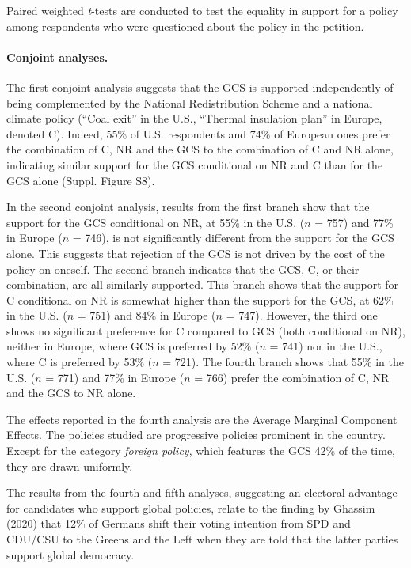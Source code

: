 \documentclass[12pt,english]{article}
\begin{document}
\begin{small}
Paired weighted \textit{t}-tests are conducted to test the equality in support for a policy among respondents who were questioned about the policy in the petition. 

\paragraph{\small Conjoint analyses.}
The first conjoint analysis suggests that the GCS is supported independently of being complemented by the National Redistribution Scheme and a national climate policy (``Coal exit'' in the U.S., ``Thermal insulation plan'' in Europe, denoted C). Indeed, 55\% of %
U.S. respondents and 74\% of %
European ones prefer the combination of C, NR and the GCS to the combination of C and NR alone, indicating similar support for the GCS conditional on NR and C than for the GCS alone (Suppl. Figure S8). %

In the second conjoint analysis, results from the first branch show that the support for the GCS conditional on NR, at 55\% in the U.S. ($n$ = 757) and 77\% in Europe ($n$ = 746), is not significantly different from the support for the GCS alone. This suggests that rejection of the GCS is not driven by the cost of the policy on oneself. The second branch indicates that the GCS, C, or their combination, are all similarly supported. This branch shows that the support for C conditional on NR is somewhat higher than the support for the GCS, at 62\% in the U.S. ($n$ = 751) and 84\% in Europe ($n$ = 747). However, the third one shows no significant preference for C compared to GCS (both conditional on NR), neither in Europe, where GCS is preferred by 52\% ($n$ = 741) nor in the U.S., where C is preferred by 53\% ($n$ = 721). The fourth branch shows that 55\% in the U.S. ($n$ = 771) and 77\% in Europe ($n$ = 766) prefer the combination of C, NR and the GCS to NR alone.

The effects reported in the fourth analysis are the Average Marginal Component Effects.\cite{hainmueller_causal_2014} The policies studied are progressive policies prominent in the country. Except for the category \textit{foreign policy}, which features the GCS 42\% of the time, they are drawn uniformly.

The results from the fourth and fifth analyses, suggesting an electoral advantage for candidates who support global policies, relate to the finding by Ghassim (2020) that 12\% of Germans shift their voting intention from SPD and CDU/CSU to the Greens and the Left when they are told that the latter parties support global democracy.\citep{ghassim_who_2020}

\end{small}
\end{document}
